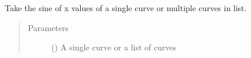 \documentclass[letterpaper,10pt,english]{sphinxmanual}
\begin{document}
\begin{fulllineitems}
\label{\detokenize{pydv:pydvpy.sinx}}
Take the sine of x values of a single curve or multiple curves in list.

\begin{sphinxVerbatim}[commandchars=\\\{\}]
  
\end{sphinxVerbatim}

\begin{sphinxVerbatim}[commandchars=\\\{\}]
\end{sphinxVerbatim}
\begin{quote}\begin{description}
\item[{Parameters}] \leavevmode
{} () \textendash{} A single curve or a list of curves

\end{description}\end{quote}

\end{fulllineitems}

\end{document}
